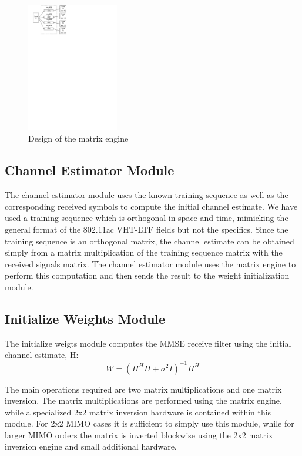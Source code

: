 \documentclass[journal]{IEEEtran}
\begin{document}
\begin{figure}[!h]
\centering
\includegraphics*[width=4cm, viewport = 30 640 260 840]{images/matrix_engine.pdf}
\caption{Design of the matrix engine}
\label{matrix_engine}
\end{figure}

\subsection{Channel Estimator Module}

The channel estimator module uses the known training sequence as well as the corresponding received symbols to compute the initial channel estimate. We have used a training sequence which is orthogonal in space and time, mimicking the general format of the 802.11ac VHT-LTF fields but not the specifics. Since the training sequence is an orthogonal matrix, the channel estimate can be obtained simply from a matrix multiplication of the training sequence matrix with the received signals matrix. The channel estimator module uses the matrix engine to perform this computation and then sends the result to the weight initialization module.

\subsection{Initialize Weights Module}

The initialize weigts module computes the MMSE receive filter using the initial channel estimate, H:
\[W = (H^H H + \sigma^2I)^{-1} H^H \]

The main operations required are two matrix multiplications and one matrix inversion. The matrix multiplications are performed using the matrix engine, while a specialized 2x2 matrix inversion hardware is contained within this module. For 2x2 MIMO cases it is sufficient to simply use this module, while for larger MIMO orders the matrix is inverted blockwise using the 2x2 matrix inversion engine and small additional hardware.
\end{document}
